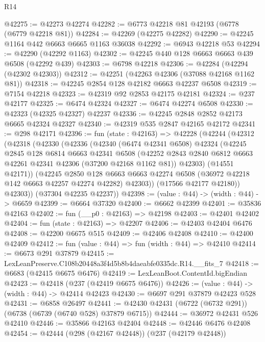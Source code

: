\begin{lexlean}{R14}
\begin{coremodule}
@42275 := @42273 @42274
@42282 := @6773 @42218 @81 @42193 (@6778 (@6779 @42218 @81))
@42284 := @42269 (@42275 @42282)
@42290 := @42245 @1164 @442 @6663 @6665 @1163 @36038
@42292 := @6943 @42218 @53
@42294 := @42290 (@42292 @1163)
@42302 := @42245 @440 @128 @6663 @6663 @439 @6508 (@42292 @439)
@42303 := @6798 @42218
@42306 := @42284 (@42294 (@42302 @42303))
@42312 := @42251 (@42263 @42306 (@37088 @42168 @1162 @81))
@42318 := @42245 @2854 @128 @42182 @6663 @42237 @6508
@42319 := @7154 @42218
@42323 := @42319 @92 @2853 @42175 @42181
@42324 := @237 @42177
@42325 := @6474 @42324
@42327 := @6474 @42274 @6508
@42330 := @42323 (@42325 @42327) @42237
@42336 := @42245 @2848 @2852 @42173 @6665 @42324 @42327
@42340 := @42319 @535 @2847 @42165 @42172
@42341 := @298 @42171
@42396 := fun (state : @42163) =>
  @42228
    (@42244
      (@42312
        (@42318
          (@42330
            (@42336
              (@42340
                (@6474 @42341 @6508)
                @42324
                (@42245
                  @2845
                  @128
                  @6814
                  @6663
                  @42341
                  @6508
                  (@42252 @2843 @2840 @6812 @6663 @42261 @42341 @42306 (@37200 @42168 @1162 @81))
                  @42303)
                (@14551 @42171))
              (@42245
                @2850
                @128
                @6663
                @6663
                @42274
                @6508
                (@36972 @42218 @142 @6663 @42257 @42274 @42282)
                @42303))
            (@17566 @42177 @42180))
          @42303))
      (@37304 @42235 @42237))
@42398 := (value : @44) -> (width : @44) -> @6659
@42399 := @6664 @37320
@42400 := @6662 @42399
@42401 := @35836 @42163
@42402 := fun (__p0 : @42163) => @42198
@42403 := @42401 @42402
@42404 := fun (state : @42163) => @42207
@42406 := @42403 @42404 @6476
@42408 := @42200 @6675 @515
@42409 := @42406 @42408
@42410 := @42400 @42409
@42412 := fun (value : @44) => fun (width : @44) => @42410
@42414 := @6673 @291 @37879
@42415 := LexLeanPreserve.C108b20448a3f4d5b8b4daeabfe0335dc.R14.__fits_7
@42418 := @6683 (@42415 @6675 @6476)
@42419 := LexLeanBoot.ContentId.bigEndian
@42423 := @42418 (@237 (@42419 @6675 @6476))
@42426 := (value : @44) -> (width : @44) -> @42414 @42423
@42430 := @6697 @291 @37879 @42423 @528
@42431 := @6858 @26497
@42441 := @42430 @42431 (@6722 (@6732 @291)) (@6738 (@6739 (@6740 @528) @37879 @6715))
@42444 := @36972 @42431 @526 @42410
@42446 := @35866 @42163 @42404
@42448 := @42446 @6476 @42408
@42454 := @42444 (@298 (@42167 @42448)) (@237 (@42179 @42448))

\end{coremodule}
\end{lexlean}

